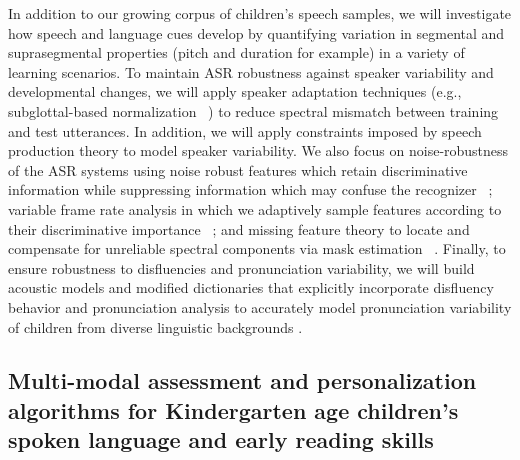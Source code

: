 
In addition to our growing corpus of children's speech samples, we will investigate how speech and language cues develop by quantifying variation in segmental and suprasegmental properties (pitch and duration for example) in a variety of learning scenarios. To maintain ASR robustness against speaker variability and developmental changes, we will apply speaker adaptation techniques (e.g., subglottal-based normalization ~\cite{arsikere2012automatic}) to reduce spectral mismatch between training and test utterances. In addition, we will apply constraints imposed by speech production theory to model speaker variability. We also focus on noise-robustness of the ASR systems using noise robust features which retain discriminative information while suppressing information which may confuse the recognizer ~\cite{strope1998robust}; variable frame rate analysis in which we adaptively sample features according to their discriminative importance ~\cite{zhu2003non, you2004entropy}; and missing feature theory to locate and compensate for unreliable spectral components via mask estimation ~\cite{borgstrom2009missing, tan2014feature}. Finally, to ensure robustness to disfluencies and pronunciation variability, we will build acoustic models and modified dictionaries that explicitly incorporate disfluency behavior and pronunciation analysis to accurately model pronunciation variability of children from diverse linguistic backgrounds  \cite{tepperman2006pronunciation}.



\subsection {Multi-modal assessment and personalization algorithms for Kindergarten age children's spoken language and early reading skills}
\label{section_assessment}

